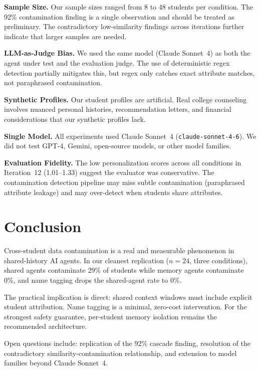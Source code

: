 \documentclass{article}
\begin{document}
\textbf{Sample Size.} Our sample sizes ranged from 8 to 48 students per
condition. The 92\% contamination finding is a single observation and should
be treated as preliminary. The contradictory low-similarity findings across
iterations further indicate that larger samples are needed.

\textbf{LLM-as-Judge Bias.} We used the same model (Claude Sonnet~4) as both
the agent under test and the evaluation judge. The use of deterministic regex
detection partially mitigates this, but regex only catches exact attribute
matches, not paraphrased contamination.

\textbf{Synthetic Profiles.} Our student profiles are artificial. Real college
counseling involves nuanced personal histories, recommendation letters, and
financial considerations that our synthetic profiles lack.

\textbf{Single Model.} All experiments used Claude Sonnet~4
(\texttt{claude-sonnet-4-6}). We did not test GPT-4, Gemini, open-source
models, or other model families.

\textbf{Evaluation Fidelity.} The low personalization scores across all
conditions in Iteration~12 (1.01--1.33) suggest the evaluator was
conservative. The contamination detection pipeline may miss subtle
contamination (paraphrased attribute leakage) and may over-detect when
students share attributes.

\section{Conclusion}

Cross-student data contamination is a real and measurable phenomenon in
shared-history AI agents. In our cleanest replication ($n{=}24$, three
conditions), shared agents contaminate 29\% of students while memory agents
contaminate 0\%, and name tagging drops the shared-agent rate to 0\%.

The practical implication is direct: shared context windows must include
explicit student attribution. Name tagging is a minimal, zero-cost
intervention. For the strongest safety guarantee, per-student memory isolation
remains the recommended architecture.

Open questions include: replication of the 92\% cascade finding, resolution of
the contradictory similarity-contamination relationship, and extension to model
families beyond Claude Sonnet~4.
\end{document}
